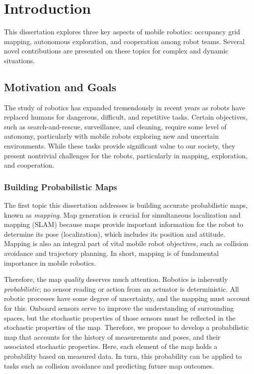 

\chapter{Introduction} \label{chap:intro}

This dissertation explores three key aspects of mobile robotics: occupancy grid mapping, autonomous exploration, and cooperation among robot teams. Several novel contributions are presented on these topics for complex and dynamic situations.


\section{Motivation and Goals}

The study of robotics has expanded tremendously in recent years as robots have replaced humans for dangerous, difficult, and repetitive tasks. Certain objectives, such as search-and-rescue, surveillance, and cleaning, require some level of autonomy, particularly with mobile robots exploring new and uncertain environments. While these tasks provide significant value to our society, they present nontrivial challenges for the robots, particularly in mapping, exploration, and cooperation.


\subsection{Building Probabilistic Maps}

The first topic this dissertation addresses is building accurate probabilistic maps, known as \emph{mapping}. Map generation is crucial for simultaneous localization and mapping (SLAM) because maps provide important information for the robot to determine its pose (localization), which includes its position and attitude. Mapping is also an integral part of vital mobile robot objectives, such as collision avoidance and trajectory planning. In short, mapping is of fundamental importance in mobile robotics.

Therefore, the map \emph{quality} deserves much attention. Robotics is inherently \emph{probabilistic}; no sensor reading or action from an actuator is deterministic. All robotic processes have some degree of uncertainty, and the mapping must account for this. Onboard sensors serve to improve the understanding of surrounding spaces, but the stochastic properties of those sensors must be reflected in the stochastic properties of the map. Therefore, we propose to develop a probabilistic map that accounts for the history of measurements and poses, and their associated stochastic properties. Here, each element of the map holds a probability based on measured data. In turn, this probability can be applied to tasks such as collision avoidance and predicting future map outcomes.


